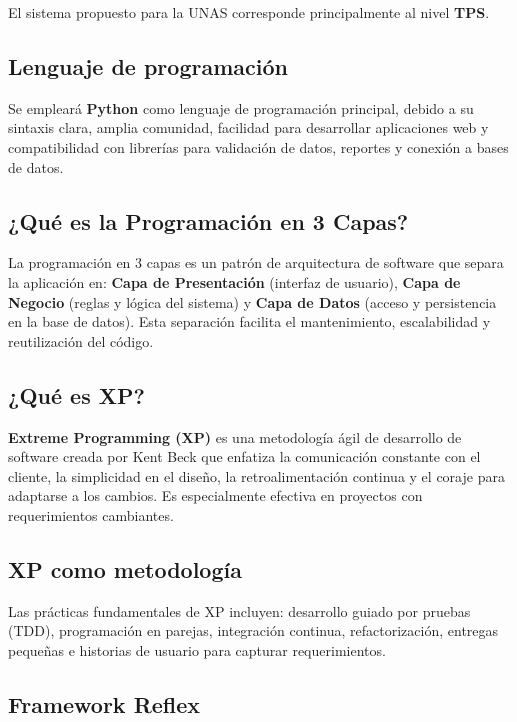 \documentclass[12pt, a4paper]{report}
\begin{document}
El sistema propuesto para la UNAS corresponde principalmente al nivel \textbf{TPS}.

\subsection{Lenguaje de programación}

Se empleará \textbf{Python} como lenguaje de programación principal, debido a su sintaxis clara, amplia comunidad, facilidad para desarrollar aplicaciones web y compatibilidad con librerías para validación de datos, reportes y conexión a bases de datos.

\subsection{¿Qué es la Programación en 3 Capas?}

La programación en 3 capas es un patrón de arquitectura de software que separa la aplicación en: \textbf{Capa de Presentación} (interfaz de usuario), \textbf{Capa de Negocio} (reglas y lógica del sistema) y \textbf{Capa de Datos} (acceso y persistencia en la base de datos). Esta separación facilita el mantenimiento, escalabilidad y reutilización del código.

\subsection{¿Qué es XP?}

\textbf{Extreme Programming (XP)} es una metodología ágil de desarrollo de software creada por Kent Beck que enfatiza la comunicación constante con el cliente, la simplicidad en el diseño, la retroalimentación continua y el coraje para adaptarse a los cambios. Es especialmente efectiva en proyectos con requerimientos cambiantes.

\subsection{XP como metodología}

Las prácticas fundamentales de XP incluyen: desarrollo guiado por pruebas (TDD), programación en parejas, integración continua, refactorización, entregas pequeñas e historias de usuario para capturar requerimientos.

\subsection{Framework Reflex}
\end{document}
